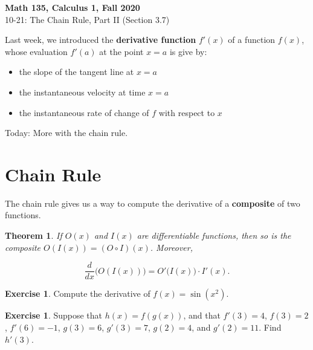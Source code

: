\documentclass[11pt,reqno,final]{amsart}
\numberwithin{figure}{section}
\newtheorem{theorem}[equation]{Theorem}%
\theoremstyle{definition} %
\newtheorem{exercise}[question]{Exercise}
\begin{document}
\begin{center}
        \textbf{\Large Math 135, Calculus 1, Fall 2020}\\[10pt]
        {\large 10-21: The Chain Rule, Part II (Section 3.7)}
\end{center}

\thispagestyle{empty}


\renewcommand{\thesection}{\Alph{section}}


Last week, we introduced the \textbf{derivative function} $f'(x)$ of a function $f(x)$, whose evaluation $f'(a)$ at the point $x=a$ is give by:
\begin{itemize}
\item the slope of the tangent line at $x=a$
\item the instantaneous velocity at time $x = a$
\item the instantaneous rate of change of $f$ with respect to $x$
\end{itemize}

Today: More with the chain rule.
\section{Chain Rule}

The chain rule gives us a way to compute the derivative of a \textbf{composite} of two functions.
\begin{theorem}
        If $O(x)$ and $I(x)$ are differentiable functions, then so is the composite $O(I(x)) = (O \circ I)(x)$.
        Moreover,
        \begin{framed}
                \[
                        \dfrac{d}{dx}\Big( O(I(x)) \Big) = O'\big( I(x) \big) \cdot I'(x).
                \]
        \end{framed}
\end{theorem}

\begin{exercise}
        Compute the derivative of $f(x) = \sin(x^2)$.
        \vfill
\end{exercise}

\begin{exercise}
        Suppose that $h(x) = f(g(x))$, and that $f'(3) = 4$, $f(3) = 2$, $f'(6) = -1$, $g(3) = 6$, $g'(3) = 7$, $g(2) = 4$, and $g'(2) = 11$.
        Find $h'(3)$.
        \vfill
\end{exercise}

\newpage
\end{document}
